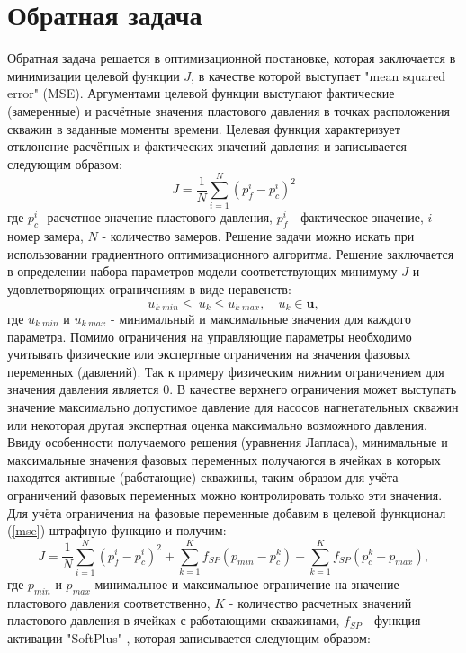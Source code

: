 \documentclass[14pt]{article}
\begin{document}
\section{Обратная задача}
Обратная задача решается в оптимизационной постановке, которая заключается в минимизации целевой функции $J$, в качестве которой выступает "mean squared error" (MSE). Аргументами целевой функции выступают фактические (замеренные) и расчётные значения пластового давления в точках расположения скважин в заданные моменты времени. Целевая функция характеризует отклонение расчётных и фактических значений давления и записывается следующим образом:
\begin{equation} \label{mse}
J=\frac{1}{N}\sum_{i=1}^N{\left(p_f^i-p_c^i\right)^2}
\end{equation}
где $p_c^i$ -расчетное значение пластового давления, $p_f^i$ - фактическое значение, $i$ - номер замера, $N$ - количество замеров. Решение задачи можно искать при использовании градиентного оптимизационного алгоритма. Решение заключается в определении набора параметров модели соответствующих минимуму $J$ и удовлетворяющих ограничениям в виде неравенств:
\begin{equation*}
u_{k\;min}\leq\ u_k\leq u_{k\;max}, \quad u_k \in \boldsymbol{u},
\end{equation*}
где $u_{k\;min}$ и $u_{k\;max}$ - минимальный и максимальные значения для каждого параметра. Помимо ограничения на управляющие параметры необходимо учитывать физические или экспертные ограничения на значения фазовых переменных (давлений). Так к примеру физическим нижним ограничением для значения давления является 0. В качестве верхнего ограничения может выступать значение максимально допустимое давление для насосов нагнетательных скважин или некоторая другая экспертная оценка максимально возможного давления. Ввиду особенности получаемого решения (уравнения Лапласа), минимальные и максимальные значения фазовых переменных получаются в ячейках в которых находятся активные (работающие) скважины, таким образом для учёта ограничений фазовых переменных можно контролировать только эти значения. Для учёта ограничения на фазовые переменные добавим в целевой функционал (\ref{mse}) штрафную функцию и получим: 
\begin{equation} \label{mse_bnd_p}
J=\frac{1}{N}\sum_{i=1}^N{\left(p_f^i-p_c^i\right)^2} + \sum_{k=1}^K{f_{SP}(p_{min} - p^k_c)} + \sum_{k=1}^K{f_{SP}(p^k_c-p_{max})},
\end{equation}
где $ p_{min} $ и $ p_{max} $ минимальное и максимальное ограничение на значение пластового давления соответственно, $K$ - количество расчетных значений пластового давления в ячейках с работающими скважинами,  $f_{SP}$ - функция активации "SoftPlus" \cite{Glorot2011}, которая записывается следующим образом:
\end{document}
